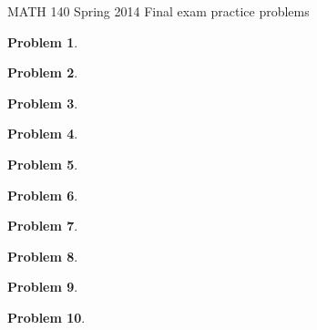 \documentclass{article}[12pt]
\newtheorem{problem}{Problem}
\begin{document}
\begin{center}
MATH 140 Spring 2014 Final exam practice problems 
\end{center}


\begin{problem}

\end{problem}

\begin{problem}

\end{problem}

\begin{problem}

\end{problem}

\begin{problem}

\end{problem}

\begin{problem}


\end{problem}

\begin{problem}

\end{problem}

\begin{problem}

\end{problem}

\begin{problem}

\end{problem}

\begin{problem}

\end{problem}

\begin{problem}

\end{problem}
\end{document}
